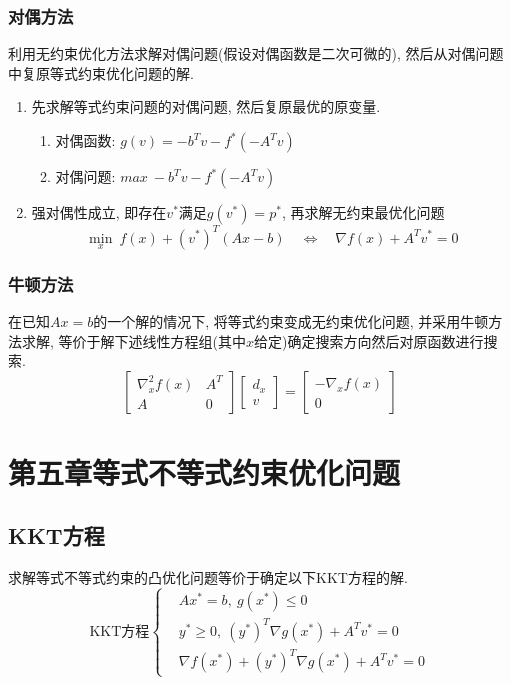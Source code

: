 \documentclass[UTF8]{article}
\begin{document}
		\subsubsection{对偶方法} 
		利用无约束优化方法求解对偶问题(假设对偶函数是二次可微的), 然后从对偶问题中复原等式约束优化问题的解.
\begin{enumerate}
	\item 先求解等式约束问题的对偶问题, 然后复原最优的原变量.
	\begin{enumerate}
		\item 对偶函数: $g(v)=-b^T v-f^*(-A^T v)$
		\item 对偶问题: $max\ -b^T v-f^*(-A^T v)$
	\end{enumerate}
	\item 强对偶性成立, 即存在$v^*$满足$g(v^*)=p^*$, 再求解无约束最优化问题$$\min\limits_{x}\ f(x)+(v^*)^T(Ax-b)\quad\Leftrightarrow\quad\nabla f(x)+A^T v^* = 0$$
\end{enumerate}
		\subsubsection{牛顿方法}
	在已知$Ax=b$的一个解的情况下, 将等式约束变成无约束优化问题, 并采用牛顿方法求解, 等价于解下述线性方程组(其中$x$给定)确定搜索方向然后对原函数进行搜索.
	$$
	\begin{bmatrix}
		\nabla^2_x f(x) & A^T \\ 
		A & 0 
	\end{bmatrix}
	\begin{bmatrix}
		d_x \\
		v
	\end{bmatrix}
	=
	\begin{bmatrix}
		-\nabla_x f(x) \\
		0
	\end{bmatrix}
	$$
	


\section{第五章\quad 等式不等式约束优化问题}

\subsection{KKT方程}
求解等式不等式约束的凸优化问题等价于确定以下KKT方程的解.
\begin{displaymath}
\text{KKT方程}\begin{cases}
&Ax^*=b,\ g(x^*)\leq 0\\
&y^*\geq 0,\ (y^*)^T \nabla g(x^*) + A^T v^* = 0 \\
&\nabla f(x^*)+(y^*)^T\nabla g(x^*)+A^T v^* = 0 
\end{cases}
\end{displaymath}
\end{document}
